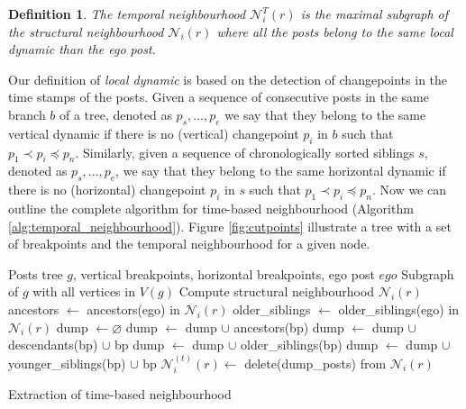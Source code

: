 \documentclass[conference]{IEEEtran}
\newtheorem{definition}{Definition}
\begin{document}
\begin{definition}
The temporal neighbourhood $\mathcal{N}_{i}^T(r)$ is the maximal subgraph of the structural neighbourhood $\mathcal{N}_i(r)$ where all the posts belong to the same local dynamic than the ego post.
\end{definition}
Our definition of \textit{local dynamic} is based on the detection of changepoints in the time stamps of the posts. Given a sequence of consecutive posts in the same branch $b$ of a tree, denoted as $p_s,...,p_e$ we say that they belong to the same vertical dynamic if there is no (vertical) changepoint $p_i$ in $b$ such that $p_1 \prec p_i \preceq p_n$. Similarly, given a sequence of chronologically sorted  siblings $s$, denoted as $p_s,...,p_e$, we say that they belong to the same horizontal dynamic if there is no (horizontal) changepoint $p_i$ in $s$ such that $p_1 \prec p_i \preceq p_n$. Now we can outline the complete algorithm for time-based neighbourhood (Algorithm \ref{alg:temporal_neighbourhood}). Figure \ref{fig:cutpoints} illustrate a tree with a set of breakpoints and the temporal neighbourhood for a given node.
\begin{algorithm}[H]
\begin{algorithmic}
\REQUIRE Posts tree $g$, vertical breakpoints, horizontal breakpoints, ego post $ego$
\ENSURE Subgraph of $g$ with all vertices in $V(g)$
\STATE Compute structural neighbourhood $\mathcal{N}_i(r)$
\STATE ancestors $\leftarrow$  ancestors(ego) in $\mathcal{N}_i(r)$
\STATE older\_siblings $\leftarrow$ older\_siblings(ego) in $\mathcal{N}_i(r)$
\STATE dump $\leftarrow \varnothing$
   \STATE dump $\leftarrow$ dump $\cup$ ancestors(bp)
 \ELSE
   \STATE dump $\leftarrow$ dump $\cup$ descendants(bp) $\cup$ bp
  \ENDIF
\ENDFOR
{}
     \STATE dump $\leftarrow$ dump $\cup$ older\_siblings(bp)
   \ELSE
     \STATE dump $\leftarrow$ dump $\cup$ younger\_siblings(bp) $\cup$ bp
  \ENDIF
\ENDFOR
\STATE $\mathcal{N}_i^{(t)}(r) \leftarrow$ delete(dump\_posts) from $\mathcal{N}_i(r)$
\end{algorithmic}
\caption{Extraction of time-based neighbourhood}
\label{alg:temporal_neighbourhood}
\end{algorithm}
\end{document}
